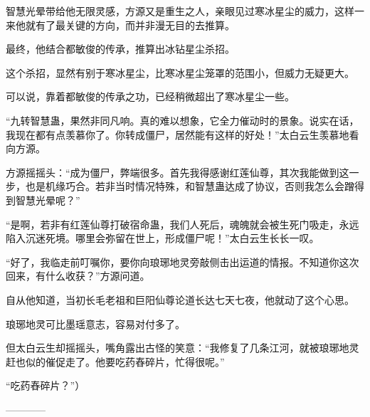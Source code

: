 \begin{this_body}
智慧光晕带给他无限灵感，方源又是重生之人，亲眼见过寒冰星尘的威力，这样一来他就有了最关键的方向，而并非漫无目的去推算。

最终，他结合都敏俊的传承，推算出冰钻星尘杀招。

这个杀招，显然有别于寒冰星尘，比寒冰星尘笼罩的范围小，但威力无疑更大。

可以说，靠着都敏俊的传承之功，已经稍微超出了寒冰星尘一些。

“九转智慧蛊，果然非同凡响。真的难以想象，它全力催动时的景象。说实在话，我现在都有点羡慕你了。你转成僵尸，居然能有这样的好处！”太白云生羡慕地看向方源。

方源摇摇头：“成为僵尸，弊端很多。首先我得感谢红莲仙尊，其次我能做到这一步，也是机缘巧合。若非当时情况特殊，和智慧蛊达成了协议，否则我怎么会蹭得到智慧光晕呢？”

“是啊，若非有红莲仙尊打破宿命蛊，我们人死后，魂魄就会被生死门吸走，永远陷入沉迷死境。哪里会弥留在世上，形成僵尸呢！”太白云生长长一叹。

“好了，我临走前叮嘱你，要你向琅琊地灵旁敲侧击出运道的情报。不知道你这次回来，有什么收获？”方源问道。

自从他知道，当初长毛老祖和巨阳仙尊论道长达七天七夜，他就动了这个心思。

琅琊地灵可比墨瑶意志，容易对付多了。

但太白云生却摇摇头，嘴角露出古怪的笑意：“我修复了几条江河，就被琅琊地灵赶也似的催促走了。他要吃药舂碎片，忙得很呢。”

“吃药舂碎片？”）

------------

\end{this_body}

